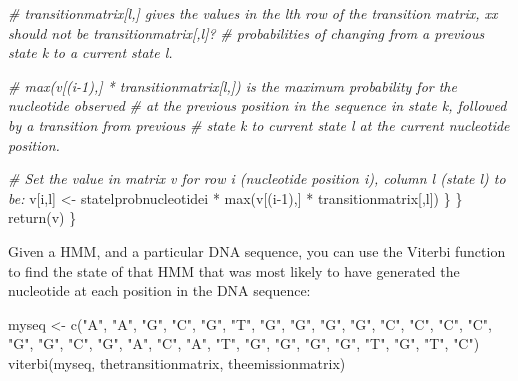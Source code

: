 \documentclass[
]{book}
\newenvironment{Shaded}{\begin{snugshade}}{\end{snugshade}}
\newcommand{\CommentTok}[1]{\textcolor[rgb]{0.56,0.35,0.01}{\textit{#1}}}
\newcommand{\DecValTok}[1]{\textcolor[rgb]{0.00,0.00,0.81}{#1}}
\newcommand{\FunctionTok}[1]{\textcolor[rgb]{0.00,0.00,0.00}{#1}}
\newcommand{\NormalTok}[1]{#1}
\newcommand{\OtherTok}[1]{\textcolor[rgb]{0.56,0.35,0.01}{#1}}
\newcommand{\SpecialCharTok}[1]{\textcolor[rgb]{0.00,0.00,0.00}{#1}}
\newcommand{\StringTok}[1]{\textcolor[rgb]{0.31,0.60,0.02}{#1}}
\begin{document}
\begin{Shaded}
\begin{Highlighting}[]
           \CommentTok{\# transitionmatrix[l,] gives the values in the lth row of the transition matrix, xx should not be transitionmatrix[,l]?}
           \CommentTok{\# probabilities of changing from a previous state k to a current state l.}

           \CommentTok{\# max(v[(i{-}1),] * transitionmatrix[l,]) is the maximum probability for the nucleotide observed}
           \CommentTok{\# at the previous position in the sequence in state k, followed by a transition from previous}
           \CommentTok{\# state k to current state l at the current nucleotide position.}

           \CommentTok{\# Set the value in matrix v for row i (nucleotide position i), column l (state l) to be:}
\NormalTok{           v[i,l] }\OtherTok{\textless{}{-}}\NormalTok{  statelprobnucleotidei }\SpecialCharTok{*} \FunctionTok{max}\NormalTok{(v[(i}\DecValTok{{-}1}\NormalTok{),] }\SpecialCharTok{*}\NormalTok{ transitionmatrix[,l])}
\NormalTok{        \}}
\NormalTok{    \}}
    \FunctionTok{return}\NormalTok{(v)}
\NormalTok{  \}}
\end{Highlighting}
\end{Shaded}

Given a HMM, and a particular DNA sequence, you can use the Viterbi function to find the state of that HMM that was most likely to have generated the nucleotide at each position in the DNA sequence:

\begin{Shaded}
\begin{Highlighting}[]
\NormalTok{myseq }\OtherTok{\textless{}{-}} \FunctionTok{c}\NormalTok{(}\StringTok{"A"}\NormalTok{, }\StringTok{"A"}\NormalTok{, }\StringTok{"G"}\NormalTok{, }\StringTok{"C"}\NormalTok{, }\StringTok{"G"}\NormalTok{, }\StringTok{"T"}\NormalTok{, }\StringTok{"G"}\NormalTok{, }\StringTok{"G"}\NormalTok{, }\StringTok{"G"}\NormalTok{, }\StringTok{"G"}\NormalTok{, }\StringTok{"C"}\NormalTok{, }\StringTok{"C"}\NormalTok{, }\StringTok{"C"}\NormalTok{, }\StringTok{"C"}\NormalTok{, }\StringTok{"G"}\NormalTok{, }\StringTok{"G"}\NormalTok{, }\StringTok{"C"}\NormalTok{, }\StringTok{"G"}\NormalTok{, }\StringTok{"A"}\NormalTok{, }\StringTok{"C"}\NormalTok{, }\StringTok{"A"}\NormalTok{, }\StringTok{"T"}\NormalTok{, }\StringTok{"G"}\NormalTok{, }\StringTok{"G"}\NormalTok{, }\StringTok{"G"}\NormalTok{, }\StringTok{"G"}\NormalTok{, }\StringTok{"T"}\NormalTok{, }\StringTok{"G"}\NormalTok{, }\StringTok{"T"}\NormalTok{, }\StringTok{"C"}\NormalTok{)}
\FunctionTok{viterbi}\NormalTok{(myseq, thetransitionmatrix, theemissionmatrix)}
\end{Highlighting}
\end{Shaded}
\end{document}
